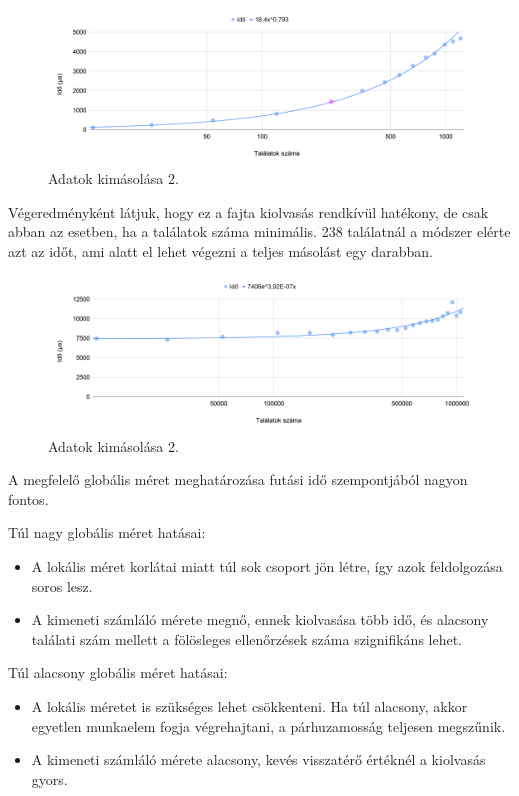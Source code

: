 \begin{figure}[h!]
\centering
\includegraphics[width=\textwidth]{images/outpuffer2.png}
\caption{Adatok kimásolása 2.}
\label{fig:schema}
\end{figure}

Végeredményként látjuk, hogy ez a fajta kiolvasás rendkívül hatékony, de csak abban az esetben, ha a találatok száma minimális.
238 találatnál a módszer elérte azt az időt, ami alatt el lehet végezni a teljes másolást egy darabban.
\begin{figure}[h!]
\centering
\includegraphics[width=\textwidth]{images/outpuffer3.png}
\caption{Adatok kimásolása 2.}
\label{fig:schema}
\end{figure}

\newpage
{}

A megfelelő globális méret meghatározása futási idő szempontjából nagyon fontos.

Túl nagy globális méret hatásai:
\begin{itemize}
\item A lokális méret korlátai miatt túl sok csoport jön létre, így azok feldolgozása soros lesz.
\item A kimeneti számláló mérete megnő, ennek kiolvasása több idő, és alacsony találati szám mellett a fölösleges ellenőrzések száma szignifikáns lehet.
\end{itemize}

Túl alacsony globális méret hatásai:
\begin{itemize}
\item A lokális méretet is szükséges lehet csökkenteni. Ha túl alacsony, akkor egyetlen munkaelem fogja végrehajtani, a párhuzamosság teljesen megszűnik.
\item A kimeneti számláló mérete alacsony, kevés visszatérő értéknél a kiolvasás gyors.
\end{itemize}


